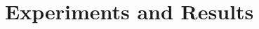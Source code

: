 \documentclass[12pt]{article}
\begin{document}
%	

\section{Experiments and Results}
\end{document}
